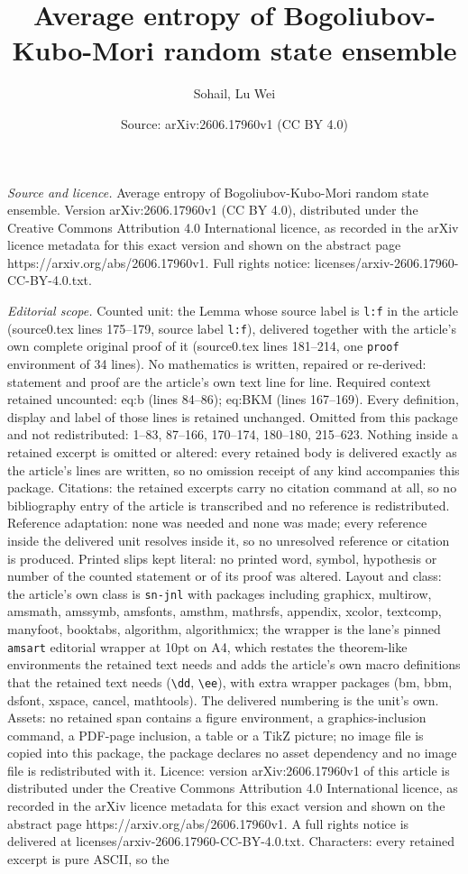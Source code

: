 \documentclass[10pt,a4paper]{amsart}
\title[Average entropy of Bogoliubov-Kubo-Mori random state ensembl]{Average entropy of Bogoliubov-Kubo-Mori random state ensemble}
\author{Sohail, Lu Wei}
\date{Source: arXiv:2606.17960v1 (CC BY 4.0)}
\begin{document}
\maketitle

\noindent\emph{Source and licence.} Average entropy of Bogoliubov-Kubo-Mori random state ensemble. Version arXiv:2606.17960v1 (CC BY 4.0), distributed under the Creative Commons Attribution 4.0 International licence, as recorded in the arXiv licence metadata for this exact version and shown on the abstract page https://arxiv.org/abs/2606.17960v1. Full rights notice: licenses/arxiv-2606.17960-CC-BY-4.0.txt.\par\smallskip

\noindent\textit{Editorial scope.} Counted unit: the Lemma whose source label is \texttt{l:f} in the article (source0.tex lines 175--179, source label \texttt{l:f}), delivered together with the article's own complete original proof of it (source0.tex lines 181--214, one \texttt{proof} environment of 34 lines). No mathematics is written, repaired or re-derived: statement and proof are the article's own text line for line. Required context retained uncounted: eq:b (lines 84--86); eq:BKM (lines 167--169). Every definition, display and label of those lines is retained unchanged. Omitted from this package and not redistributed: 1--83, 87--166, 170--174, 180--180, 215--623. Nothing inside a retained excerpt is omitted or altered: every retained body is delivered exactly as the article's lines are written, so no omission receipt of any kind accompanies this package. Citations: the retained excerpts carry no citation command at all, so no bibliography entry of the article is transcribed and no reference is redistributed. Reference adaptation: none was needed and none was made; every reference inside the delivered unit resolves inside it, so no unresolved reference or citation is produced. Printed slips kept literal: no printed word, symbol, hypothesis or number of the counted statement or of its proof was altered. Layout and class: the article's own class is \texttt{sn-jnl} with packages including graphicx, multirow, amsmath, amssymb, amsfonts, amsthm, mathrsfs, appendix, xcolor, textcomp, manyfoot, booktabs, algorithm, algorithmicx; the wrapper is the lane's pinned \texttt{amsart} editorial wrapper at 10pt on A4, which restates the theorem-like environments the retained text needs and adds the article's own macro definitions that the retained text needs (\texttt{\textbackslash dd}, \texttt{\textbackslash ee}), with extra wrapper packages (bm, bbm, dsfont, xspace, cancel, mathtools). The delivered numbering is the unit's own. Assets: no retained span contains a figure environment, a graphics-inclusion command, a PDF-page inclusion, a table or a TikZ picture; no image file is copied into this package, the package declares no asset dependency and no image file is redistributed with it. Licence: version arXiv:2606.17960v1 of this article is distributed under the Creative Commons Attribution 4.0 International licence, as recorded in the arXiv licence metadata for this exact version and shown on the abstract page https://arxiv.org/abs/2606.17960v1. A full rights notice is delivered at licenses/arxiv-2606.17960-CC-BY-4.0.txt. Characters: every retained excerpt is pure ASCII, so the 
\end{document}
